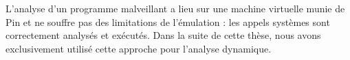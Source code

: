 L'analyse d'un programme malveillant a lieu sur une machine virtuelle munie de Pin et ne souffre pas des limitations de l'émulation : les appels systèmes sont correctement analysés et exécutés. 
Dans la suite de cette thèse, nous avons exclusivement utilisé cette approche pour l'analyse dynamique.

